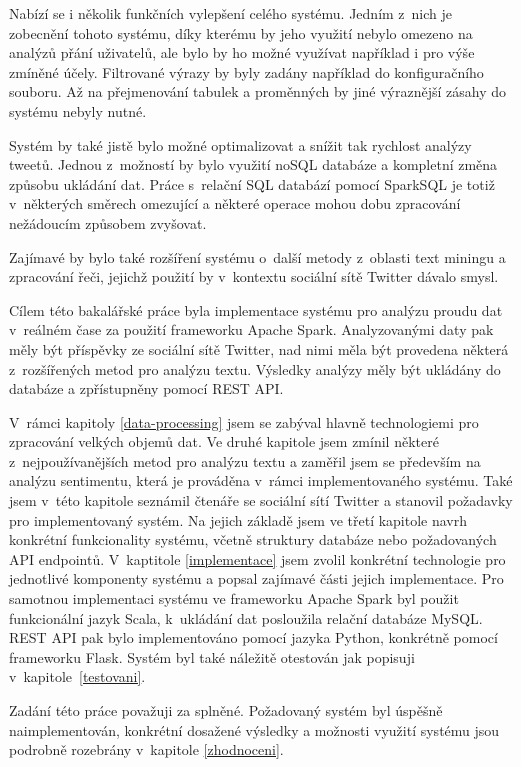 \documentclass[thesis=B,czech]{FITthesis}[2012/06/26]
\begin{document}
Nabízí se i několik funkčních vylepšení celého systému. Jedním z~nich je zobecnění tohoto systému, díky kterému by jeho využití nebylo omezeno na analýzů přání uživatelů, ale bylo by ho možné využívat například i pro výše zmíněné účely. Filtrované výrazy by byly zadány například do konfiguračního souboru. Až na přejmenování tabulek a proměnných by jiné výraznější zásahy do systému nebyly nutné. 

Systém by také jistě bylo možné optimalizovat a snížit tak rychlost analýzy tweetů. Jednou z~možností by bylo využití noSQL databáze a kompletní změna způsobu ukládání dat. Práce s~relační SQL databází pomocí SparkSQL je totiž v~některých směrech omezující a některé operace mohou dobu zpracování nežádoucím způsobem zvyšovat. 

Zajímavé by bylo také rozšíření systému o~další metody z~oblasti text miningu a zpracování řeči, jejichž použití by v~kontextu sociální sítě Twitter dávalo smysl. 


\begin{conclusion}
	Cílem této bakalářské práce byla implementace systému pro analýzu proudu dat v~reálném čase za použití frameworku Apache Spark. Analyzovanými daty pak měly být příspěvky ze sociální sítě Twitter, nad nimi měla být provedena některá z~rozšířených metod pro analýzu textu. Výsledky analýzy měly být ukládány do databáze a zpřístupněny pomocí REST API. 
	
	V~rámci kapitoly \ref{data-processing} jsem se zabýval hlavně technologiemi pro zpracování velkých objemů dat. Ve druhé kapitole jsem zmínil některé z~nejpoužívanějších metod pro analýzu textu a zaměřil jsem se především na analýzu sentimentu, která je prováděna v~rámci implementovaného systému. Také jsem v~této kapitole seznámil čtenáře se sociální sítí Twitter a stanovil požadavky pro implementovaný systém. Na jejich základě jsem ve třetí kapitole navrh konkrétní funkcionality systému, včetně struktury databáze nebo požadovaných API endpointů. V~kaptitole \ref{implementace} jsem zvolil konkrétní technologie pro jednotlivé komponenty systému a popsal zajímavé části jejich implementace. Pro samotnou implementaci systému ve frameworku Apache Spark byl použit funkcionální  jazyk Scala, k~ukládání dat posloužila relační databáze MySQL. REST API pak bylo implementováno pomocí jazyka Python, konkrétně pomocí frameworku Flask. Systém byl také náležitě otestován jak popisuji v~kapitole~\ref{testovani}. 
	
	Zadání této práce považuji za splněné. Požadovaný systém byl úspěšně naimplementován, konkrétní dosažené výsledky a možnosti využití systému jsou podrobně rozebrány v~kapitole \ref{zhodnoceni}. 
\end{conclusion}
\end{document}
